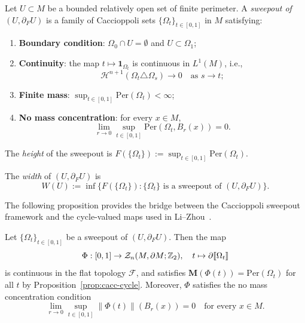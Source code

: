 \begin{definition}\label{def:sweepout}
Let $U \subset M$ be a bounded relatively open set of finite perimeter. A \emph{sweepout of $(U, \partial_F U)$} is a family of Caccioppoli sets $\{\Omega_t\}_{t \in [0,1]}$ in $M$ satisfying:
\begin{enumerate}[label=\textup{(sw\arabic*)}]
    \item\label{sw:boundary} \textbf{Boundary condition}: $\Omega_0 \cap U = \emptyset$ and $U \subset \Omega_1$;
    \item\label{sw:continuity} \textbf{Continuity}: the map $t \mapsto \mathbf{1}_{\Omega_t}$ is continuous in $L^1(M)$, i.e.,
    \[
    \mathcal{H}^{n+1}(\Omega_t \triangle \Omega_s) \to 0 \quad \text{as } s \to t;
    \]
    \item\label{sw:finite-mass} \textbf{Finite mass}: $\sup_{t \in [0,1]} \mathrm{Per}(\Omega_t) < \infty$;
    \item\label{sw:no-concentration} \textbf{No mass concentration}: for every $x \in M$,
    \[
    \lim_{r \to 0} \sup_{t \in [0,1]} \mathrm{Per}(\Omega_t, B_r(x)) = 0.
    \]
\end{enumerate}
The \emph{height} of the sweepout is $F(\{\Omega_t\}) := \sup_{t \in [0,1]} \mathrm{Per}(\Omega_t)$.
\end{definition}

\begin{definition}[Width]\label{def:width}
The \emph{width} of $(U, \partial_F U)$ is
\[
W(U) := \inf\bigl\{ F(\{\Omega_t\}) : \{\Omega_t\} \text{ is a sweepout of } (U, \partial_F U) \bigr\}.
\]
\end{definition}

The following proposition provides the bridge between the Caccioppoli sweepout framework and the cycle-valued maps used in Li--Zhou~\cite{LZ17}.

\begin{proposition}\label{prop:sweepout-cycle}
Let $\{\Omega_t\}_{t \in [0,1]}$ be a sweepout of $(U, \partial_F U)$. Then the map
\[
\Phi: [0,1] \to \mathcal{Z}_n(M, \partial M;\mathbb{Z}_2), \quad t \mapsto \partial\llbracket \Omega_t \rrbracket
\]
is continuous in the flat topology $\mathcal{F}$, and satisfies $\mathbf{M}(\Phi(t)) = \mathrm{Per}(\Omega_t)$ for all $t$ by Proposition~\ref{prop:cacc-cycle}. Moreover, $\Phi$ satisfies the no mass concentration condition
\[
\lim_{r \to 0} \sup_{t \in [0,1]} \|\Phi(t)\|(B_r(x)) = 0 \quad \text{for every } x \in M.
\]
\end{proposition}


